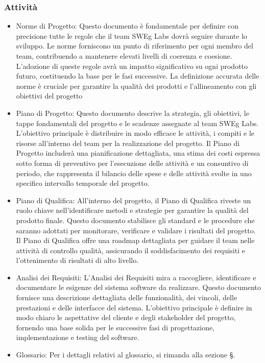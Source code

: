 \subsubsection{Attività}

\begin{itemize}
\item Norme di Progetto: Questo documento è fondamentale per definire con precisione tutte le regole che il team SWEg Labs dovrà seguire durante lo sviluppo. Le norme forniscono un punto di riferimento per ogni membro del team, contribuendo a mantenere elevati livelli di coerenza e coesione. L'adozione di queste regole avrà un impatto significativo su ogni prodotto futuro, costituendo la base per le fasi successive. La definizione accurata delle norme è cruciale per garantire la qualità dei prodotti e l’allineamento con gli obiettivi del progetto
\item Piano di Progetto: Questo documento descrive la strategia, gli obiettivi, le tappe fondamentali del progetto e le scadenze assegnate al team SWEg Labs. L'obiettivo principale è distribuire in modo efficace le attività, i compiti e le risorse all'interno del team per la realizzazione del progetto. Il Piano di Progetto includerà una pianificazione dettagliata, una stima dei costi espressa sotto forma di preventivo per l’esecuzione delle attività e un consuntivo di periodo, che rappresenta il bilancio delle spese e delle attività svolte in uno specifico intervallo temporale del progetto.
\item Piano di Qualifica: All'interno del progetto, il Piano di Qualifica riveste un ruolo chiave nell'identificare metodi e strategie per garantire la qualità del prodotto finale. Questo documento stabilisce gli standard e le procedure che saranno adottati per monitorare, verificare e validare i risultati del progetto. Il Piano di Qualifica offre una roadmap dettagliata per guidare il team nelle attività di controllo qualità, assicurando il soddisfacimento dei requisiti e l'ottenimento di risultati di alto livello.
\item Analisi dei Requisiti: L'Analisi dei Requisiti mira a raccogliere, identificare e documentare le esigenze del sistema software da realizzare. Questo documento fornisce una descrizione dettagliata delle funzionalità, dei vincoli, delle prestazioni e delle interfacce del sistema. L'obiettivo principale è definire in modo chiaro le aspettative del cliente e degli stakeholder del progetto, fornendo una base solida per le successive fasi di progettazione, implementazione e testing del software.
\item Glossario: Per i dettagli relativi al glossario, si rimanda alla sezione \S{}.
\end{itemize}